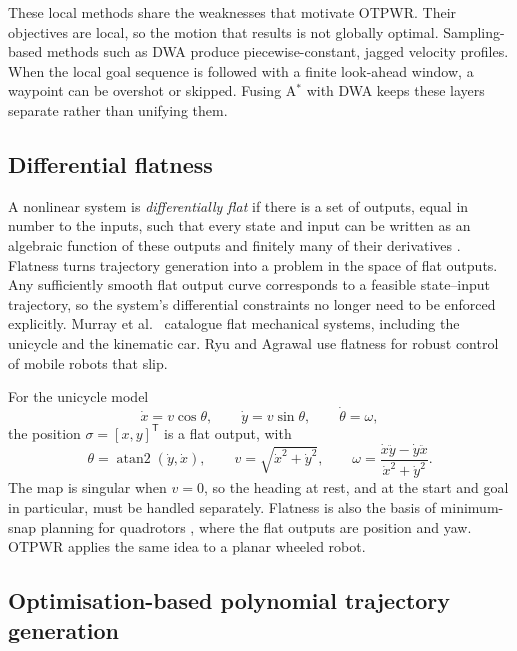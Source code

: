 \documentclass[11pt,a4paper]{article}
\begin{document}
These local methods share the weaknesses that motivate OTPWR. Their
objectives are local, so the motion that results is not globally optimal.
Sampling-based methods such as DWA produce piecewise-constant, jagged
velocity profiles. When the local goal sequence is followed with a finite
look-ahead window, a waypoint can be overshot or skipped. Fusing A$^\ast$
with DWA \citep{liu2023kinematically} keeps these layers separate rather than
unifying them.

\subsection{Differential flatness}
\label{sec:lit-flat}

A nonlinear system is \emph{differentially flat} if there is a set of outputs,
equal in number to the inputs, such that every state and input can be written
as an algebraic function of these outputs and finitely many of their
derivatives \citep{fliess1995flatness}. Flatness turns trajectory generation
into a problem in the space of flat outputs. Any sufficiently smooth flat
output curve corresponds to a feasible state--input trajectory, so the
system's differential constraints no longer need to be enforced explicitly.
Murray et al.\ \citep{murray1995flat} catalogue flat mechanical systems,
including the unicycle and the kinematic car. Ryu and Agrawal
\citep{ryu2011differential} use flatness for robust control of mobile robots
that slip.

For the unicycle model
\begin{equation}
  \dot x = v\cos\theta,\qquad
  \dot y = v\sin\theta,\qquad
  \dot\theta = \omega,
\end{equation}
the position $\sigma=[x,y]^{\mathsf T}$ is a flat output, with
\begin{equation}
  \theta=\operatorname{atan2}(\dot y,\dot x),\qquad
  v=\sqrt{\dot x^2+\dot y^2},\qquad
  \omega=\frac{\dot x\ddot y-\dot y\ddot x}{\dot x^2+\dot y^2}.
\end{equation}
The map is singular when $v=0$, so the heading at rest, and at the start and
goal in particular, must be handled separately. Flatness is also the basis
of minimum-snap planning for quadrotors \citep{mellinger2011minimum}, where
the flat outputs are position and yaw. OTPWR applies the same idea to a
planar wheeled robot.

\subsection{Optimisation-based polynomial trajectory generation}
\label{sec:lit-poly}
\end{document}

